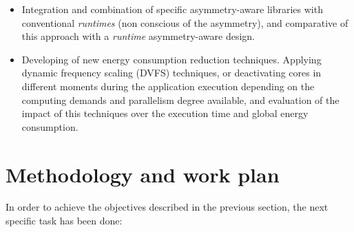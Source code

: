 \begin{itemize}
\item Integration and combination of specific asymmetry-aware libraries
  with conventional \emph{runtimes}  (non conscious of the asymmetry), and
  comparative of this approach with a \emph{runtime} asymmetry-aware
  design.

\item Developing of new energy consumption reduction techniques. Applying
  dynamic frequency scaling (DVFS) techniques, or deactivating cores in
  different moments during the application execution depending on the
  computing demands and parallelism degree available, and evaluation of the
  impact of this techniques over the execution time and global energy
  consumption. 
\end{itemize}









\section*{Methodology and work plan}

In order to achieve the objectives described in the previous section, the
next specific task has been done:

